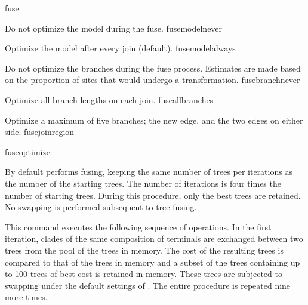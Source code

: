 \begin{command}{fuse}{}
\begin{arguments}
{            \begin{description}

                    {Do not optimize the model during the fuse.}
                    {fusemodelnever}

                    {Optimize the model after every join (default).}
                    {fusemodelalways}

                    {Do not optimize the branches during the fuse process.
                    Estimates are made based on the proportion of sites that
                    would undergo a transformation.}
                    {fusebranchnever}

                    {Optimize all branch lengths on each join.}
                    {fuseallbranches}

                    {Optimize a maximum of five branches; the new edge, and the two
                    edges on either side.}
                    {fusejoinregion}

            \end{description}
            }
            {fuseoptimize}

    \end{arguments}
    
        {By default \poy performs fusing, keeping the same number of trees per
        iterations as the number of the starting trees. The number of iterations is
        four times the number of starting trees. During this procedure, only the best
        trees are retained. No swapping is performed subsequent to tree fusing.}
        
    \begin{poyexamples}
	
            {This command executes the following sequence of operations. In the
            first iteration, clades of the same composition of terminals are exchanged
            between two trees from the pool of the trees in memory. The cost of the
            resulting trees is compared to that of the trees in memory and a subset of
            the trees containing up to 100 trees of best cost is retained in memory.
            These trees are subjected to swapping under the default settings of
            . The entire procedure is repeated nine more times.}
            

\end{poyexamples}
\end{command}
